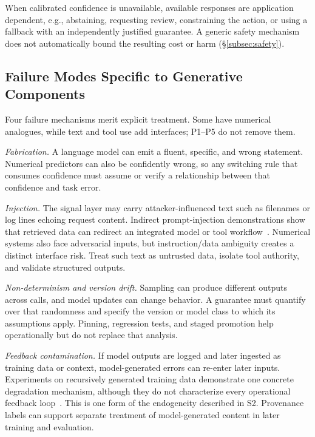 \documentclass[acmsmall,screen,nonacm]{acmart}
\theoremstyle{acmdefinition}%
\begin{document}
When calibrated confidence is unavailable, available responses are application dependent, e.g., abstaining, requesting review, constraining the action, or using a fallback with an independently justified guarantee. A generic safety mechanism does not automatically bound the resulting cost or harm (\S\ref{subsec:safety}).

\subsection{Failure Modes Specific to Generative Components}
\label{subsec:llm_failures}

Four failure mechanisms merit explicit treatment. Some have numerical analogues, while text and tool use add interfaces; P1--P5 do not remove them.

\emph{Fabrication.} A language model can emit a fluent, specific, and wrong statement. Numerical predictors can also be confidently wrong, so any switching rule that consumes confidence must assume or verify a relationship between that confidence and task error.

\emph{Injection.} The signal layer may carry attacker-influenced text such as filenames or log lines echoing request content. Indirect prompt-injection demonstrations show that retrieved data can redirect an integrated model or tool workflow~\cite{greshake2023prompt}. Numerical systems also face adversarial inputs, but instruction/data ambiguity creates a distinct interface risk. Treat such text as untrusted data, isolate tool authority, and validate structured outputs.

\emph{Non-determinism and version drift.} Sampling can produce different outputs across calls, and model updates can change behavior. A guarantee must quantify over that randomness and specify the version or model class to which its assumptions apply. Pinning, regression tests, and staged promotion help operationally but do not replace that analysis.

\emph{Feedback contamination.} If model outputs are logged and later ingested as training data or context, model-generated errors can re-enter later inputs. Experiments on recursively generated training data demonstrate one concrete degradation mechanism, although they do not characterize every operational feedback loop~\cite{shumailov2024collapse}. This is one form of the endogeneity described in S2. Provenance labels can support separate treatment of model-generated content in later training and evaluation.
\end{document}
